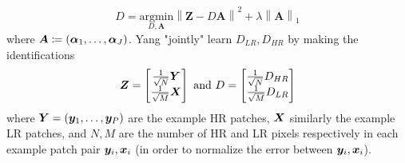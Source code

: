 \begin{equation}
    \hat{D} = \underset{D, \bm{A}}{\text{argmin}} \left\| \bm{Z} - D\bm{A} \right\|^2 + \lambda \left\| \bm{A} \right\|_1
\end{equation}
where $\bm{A} \coloneqq \left( \bm{\alpha}_1, \mathellipsis, \bm{\alpha}_J  \right)$.
%
Yang \etal "jointly" learn $D_{LR}, D_{HR}$ by making the identifications
\begin{equation*}
    \bm{Z} = \begin{bmatrix}
                 \frac{1}{\sqrt{N}}\bm{Y} \\ \frac{1}{\sqrt{M}} \bm{X}
    \end{bmatrix} \text{ and }
    D = \begin{bmatrix}
            \frac{1}{\sqrt{N}} D_{HR} \\ \frac{1}{\sqrt{M}} D_{LR}
    \end{bmatrix}
\end{equation*}
where $\bm{Y} = \left( \bm{y}_1, \mathellipsis, \bm{y}_P \right)$ are the example HR patches, $\bm{X}$ similarly the example LR patches, and $N, M$ are the number of HR and LR pixels respectively in each example patch pair $\bm{y}_i, \bm{x}_i$ (in order to normalize the error between $\bm{y}_i, \bm{x}_i$).


